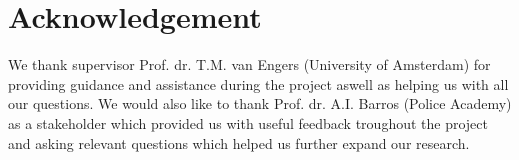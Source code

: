 \section {Acknowledgement}

We thank supervisor Prof. dr. T.M. van Engers (University of Amsterdam) for providing guidance and assistance during the project aswell as helping us with all our questions. We would also like to thank Prof. dr. A.I. Barros (Police Academy) as a stakeholder which provided us with useful feedback troughout the project and asking relevant questions which helped us further expand our research.